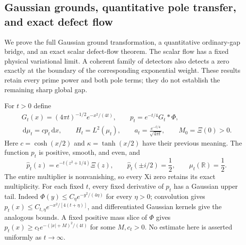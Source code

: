 \documentclass[11pt]{article}
\theoremstyle{remark}\newtheorem{remark}[theorem]{Remark}
\newcommand{\R}{\mathbb R}
\newcommand{\dd}{\,\mathrm d}
\begin{document}
\subsection{Gaussian grounds, quantitative pole transfer, and exact defect flow}
\label{sec:heat-ground}
We prove the full Gaussian ground transformation, a quantitative
ordinary-gap bridge, and an exact scalar defect-flow theorem.
The scalar flow has a fixed physical variational limit.
A coherent family of detectors also detects a zero exactly at the
boundary of the corresponding exponential weight. These results
retain every prime power and both pole terms; they do not establish
the remaining sharp global gap.

For $t>0$ define
\[
 \begin{gathered}
 G_t(x)=(4\pi t)^{-1/2}e^{-x^2/(4t)},\qquad
 p_t=e^{-t/4}G_t*\Phi,\\
 \dd\mu_t=c p_t\dd x,\qquad H_t=L^2(\mu_t),\qquad
 a_t=\frac{e^{-t/4}}{\sqrt{4\pi t}},\qquad M_0=\Xi(0)>0.
 \end{gathered}
                                                               \tag{HGF1}
\]
Here $c=\cosh(x/2)$ and $\kappa=\tanh(x/2)$ have their previous
meaning. The function $p_t$ is positive, smooth, and even, and
\[
 \widehat p_t(z)=e^{-t(z^2+1/4)}\Xi(z),\qquad
 \widehat p_t(\pm i/2)=\frac12,\qquad \mu_t(\R)=\frac12.
                                                               \tag{HGF2}
\]
The entire multiplier is nonvanishing, so every Xi zero retains
its exact multiplicity. For each fixed $t$, every fixed derivative
of $p_t$ has a Gaussian upper tail. Indeed $\Phi(y)\le
C_\eta e^{-y^2/(4\eta)}$ for every $\eta>0$; convolution gives
$p_t(x)\le C_{t,\eta}e^{-x^2/[4(t+\eta)]}$, and differentiated
Gaussian kernels give the analogous bounds. A fixed positive
mass slice of $\Phi$ gives
$p_t(x)\ge c_t e^{-(|x|+M)^2/(4t)}$ for some $M,c_t>0$.
No estimate here is asserted uniformly as $t\to\infty$.
\end{document}
